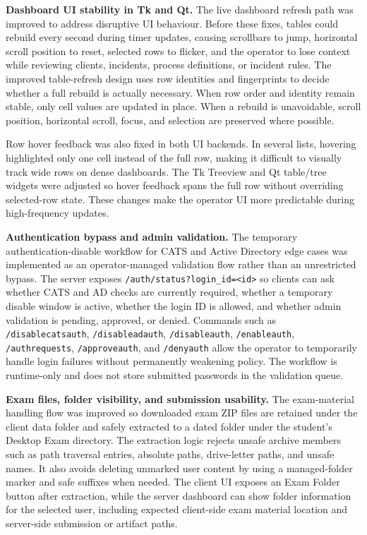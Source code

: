 \textbf{Dashboard UI stability in Tk and Qt.} The live dashboard refresh path was improved to address disruptive UI behaviour. Before these fixes, tables could rebuild every second during timer updates, causing scrollbars to jump, horizontal scroll position to reset, selected rows to flicker, and the operator to lose context while reviewing clients, incidents, process definitions, or incident rules. The improved table-refresh design uses row identities and fingerprints to decide whether a full rebuild is actually necessary. When row order and identity remain stable, only cell values are updated in place. When a rebuild is unavoidable, scroll position, horizontal scroll, focus, and selection are preserved where possible.

Row hover feedback was also fixed in both UI backends. In several lists, hovering highlighted only one cell instead of the full row, making it difficult to visually track wide rows on dense dashboards. The Tk Treeview and Qt table/tree widgets were adjusted so hover feedback spans the full row without overriding selected-row state. These changes make the operator UI more predictable during high-frequency updates.

\textbf{Authentication bypass and admin validation.} The temporary authentication-disable workflow for CATS and Active Directory edge cases was implemented as an operator-managed validation flow rather than an unrestricted bypass. The server exposes \texttt{/auth/status?login\_id=<id>} so clients can ask whether CATS and AD checks are currently required, whether a temporary disable window is active, whether the login ID is allowed, and whether admin validation is pending, approved, or denied. Commands such as \texttt{/disablecatsauth}, \texttt{/disableadauth}, \texttt{/disableauth}, \texttt{/enableauth}, \texttt{/authrequests}, \texttt{/approveauth}, and \texttt{/denyauth} allow the operator to temporarily handle login failures without permanently weakening policy. The workflow is runtime-only and does not store submitted passwords in the validation queue.

\textbf{Exam files, folder visibility, and submission usability.} The exam-material handling flow was improved so downloaded exam ZIP files are retained under the client data folder and safely extracted to a dated folder under the student's Desktop Exam directory. The extraction logic rejects unsafe archive members such as path traversal entries, absolute paths, drive-letter paths, and unsafe names. It also avoids deleting unmarked user content by using a managed-folder marker and safe suffixes when needed. The client UI exposes an Exam Folder button after extraction, while the server dashboard can show folder information for the selected user, including expected client-side exam material location and server-side submission or artifact paths.

